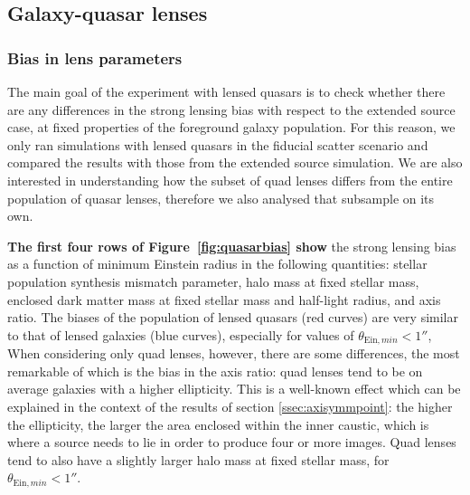 \documentclass{aa}
\def\Fref#1{Figure~\ref{#1}\xspace}
\begin{document}
\subsection{Galaxy-quasar lenses}\label{ssec:quasarbias}

\subsubsection{Bias in lens parameters}

The main goal of the experiment with lensed quasars is to check whether there are any differences in the strong lensing bias with respect to the extended source case, at fixed properties of the foreground galaxy population.
For this reason, we only ran simulations with lensed quasars in the fiducial scatter scenario and compared the results with those from the extended source simulation.
We are also interested in understanding how the subset of quad lenses differs from the entire population of quasar lenses, therefore we also analysed that subsample on its own.

{\bf The first four rows of \Fref{fig:quasarbias} show} the strong lensing bias as a function of minimum Einstein radius in the following quantities: stellar population synthesis mismatch parameter, halo mass at fixed stellar mass, enclosed dark matter mass at fixed stellar mass and half-light radius, and axis ratio.
The biases of the population of lensed quasars (red curves) are very similar to that of lensed galaxies (blue curves), especially for values of $\theta_{\mathrm{Ein},min}<1''$, 
When considering only quad lenses, however, there are some differences, the most remarkable of which is the bias in the axis ratio: quad lenses tend to be on average galaxies with a higher ellipticity.
This is a well-known effect \citep[see e.g.][]{KKS97} which can be explained in the context of the results of section \ref{ssec:axisymmpoint}: the higher the ellipticity, the larger the area enclosed within the inner caustic, which is where a source needs to lie in order to produce four or more images.
Quad lenses tend to also have a slightly larger halo mass at fixed stellar mass, for $\theta_{\mathrm{Ein},min}<1''$.
\end{document}
